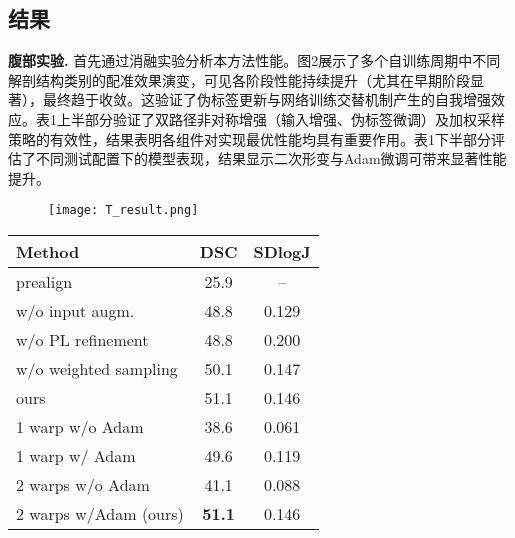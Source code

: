 \subsection{结果}

\textbf{腹部实验.} 首先通过消融实验分析本方法性能。图2展示了多个自训练周期中不同解剖结构类别的配准效果演变，可见各阶段性能持续提升（尤其在早期阶段显著），最终趋于收敛。这验证了伪标签更新与网络训练交替机制产生的自我增强效应。表1上半部分验证了双路径非对称增强（输入增强、伪标签微调）及加权采样策略的有效性，结果表明各组件对实现最优性能均具有重要作用。表1下半部分评估了不同测试配置下的模型表现，结果显示二次形变与Adam微调可带来显著性能提升。

\begin{figure}
  \centering
  \texttt{[image: T\_result.png]}
\end{figure}

\begin{table}
  \vspace{0.5em}\centering\wuhao
  \begin{tabular}{lcc}
    \toprule
    \textbf{Method}       & \textbf{DSC}  & \textbf{SDlogJ} \\
    \midrule
    prealign              & 25.9          & --              \\
    w/o input augm.       & 48.8          & 0.129           \\
    w/o PL refinement     & 48.8          & 0.200           \\
    w/o weighted sampling & 50.1          & 0.147           \\
    ours                  & 51.1          & 0.146           \\
    \midrule
    1 warp w/o Adam       & 38.6          & 0.061           \\
    1 warp w/ Adam        & 49.6          & 0.119           \\
    2 warps w/o Adam      & 41.1          & 0.088           \\
    2 warps w/Adam (ours) & \textbf{51.1} & 0.146           \\
    \bottomrule
  \end{tabular}
\end{table}

